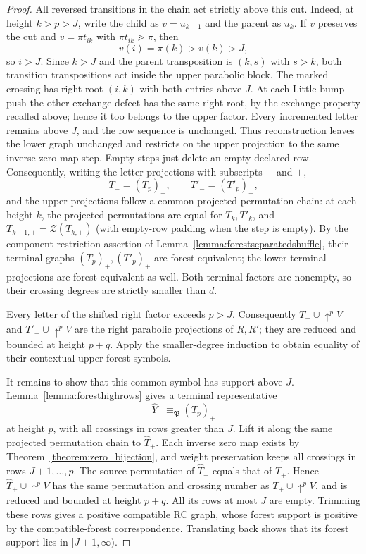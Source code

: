 \documentclass{amsart}
\theoremstyle{definition}
\theoremstyle{remark}
\numberwithin{equation}{subsection}
\newcommand{\shup}{{\uparrow}}
\newcommand{\zeromap}{\mathcal{Z}}
\newcommand{\forest}{\mathfrak{P}}
\begin{document}
\begin{proof}
All reversed transitions in the chain act strictly above this cut. Indeed, at height $k>p>J$, write the child as $v=u_{k-1}$ and the parent as $u_k$. If $v$ preserves the cut and $v=\pi t_{ik}$ with $\pi t_{ik}\gtrdot\pi$, then
$$v(i)=\pi(k)>v(k)>J,$$
so $i>J$. Since $k>J$ and the parent transposition is $(k,s)$ with $s>k$, both transition transpositions act inside the upper parabolic block. The marked crossing has right root $(i,k)$ with both entries above $J$. At each Little-bump push the other exchange defect has the same right root, by the exchange property recalled above; hence it too belongs to the upper factor. Every incremented letter remains above $J$, and the row sequence is unchanged. Thus reconstruction leaves the lower graph unchanged and restricts on the upper projection to the same inverse zero-map step. Empty steps just delete an empty declared row. Consequently, writing the letter projections with subscripts $-$ and $+$,
$$T_-= (T_p)_-,\qquad T'_-= (T'_p)_-,$$
and the upper projections follow a common projected permutation chain: at each height $k$, the projected permutations are equal for $T_k,T'_k$, and $T_{k-1,+}=\zeromap(T_{k,+})$ (with empty-row padding when the step is empty). By the component-restriction assertion of Lemma~\ref{lemma:forestseparatedshuffle}, their terminal graphs $(T_p)_+,(T'_p)_+$ are forest equivalent; the lower terminal projections are forest equivalent as well. Both terminal factors are nonempty, so their crossing degrees are strictly smaller than $d$.

Every letter of the shifted right factor exceeds $p>J$. Consequently $T_+\cup\shup^pV$ and $T'_+\cup\shup^pV$ are the right parabolic projections of $R,R'$; they are reduced and bounded at height $p+q$. Apply the smaller-degree induction to obtain equality of their contextual upper forest symbols.

It remains to show that this common symbol has support above $J$. Lemma~\ref{lemma:foresthighrows} gives a terminal representative
$$\widehat Y_+\equiv_\forest(T_p)_+$$
at height $p$, with all crossings in rows greater than $J$. Lift it along the same projected permutation chain to $\widehat T_+$. Each inverse zero map exists by Theorem~\ref{theorem:zero_bijection}, and weight preservation keeps all crossings in rows $J+1,\ldots,p$. The source permutation of $\widehat T_+$ equals that of $T_+$. Hence $\widehat T_+\cup\shup^pV$ has the same permutation and crossing number as $T_+\cup\shup^pV$, and is reduced and bounded at height $p+q$. All its rows at most $J$ are empty. Trimming these rows gives a positive compatible RC graph, whose forest support is positive by the compatible-forest correspondence. Translating back shows that its forest support lies in $[J+1,\infty)$.


\end{proof}
\end{document}
